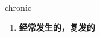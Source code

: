 
\begin{frame}
{\huge chronic}
\begin{center}
\begin{enumerate}\Large
  \item \textbf{经常发生的，复发的}
\end{enumerate}
\end{center}
\end{frame}
